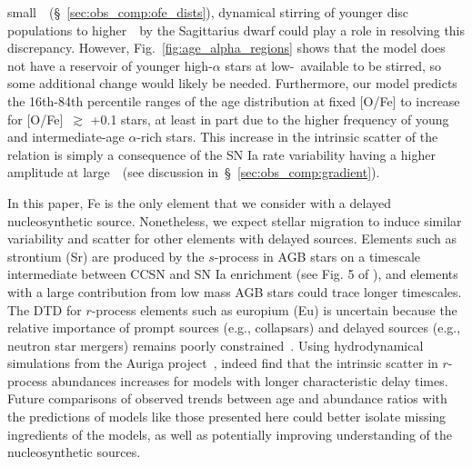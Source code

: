 \documentclass[draft2.tex]{subfiles}
\begin{document}
small~\rgal~(\S~\ref{sec:obs_comp:ofe_dists}), dynamical stirring of younger 
disc populations to higher~\absz~by the Sagittarius dwarf could play a role in 
resolving this discrepancy. 
However, Fig.~\ref{fig:age_alpha_regions} shows that the model does not have a 
reservoir of younger high-$\alpha$ stars at low-\absz~available to be stirred, 
so some additional change would likely be needed. 
Furthermore, our model predicts the 16th-84th percentile ranges of the age 
distribution at fixed [O/Fe] to increase for [O/Fe]~$\gtrsim$ +0.1 stars, at 
least in part due to the higher frequency of young and intermediate-age 
$\alpha$-rich stars. 
This increase in the intrinsic scatter of the relation is simply a consequence 
of the SN Ia rate variability having a higher amplitude at large~\rgal~(see 
discussion in~\S~\ref{sec:obs_comp:gradient}). 
\par 
In this paper, Fe is the only element that we consider with a delayed 
nucleosynthetic source. 
Nonetheless, we expect stellar migration to induce similar variability and 
scatter for other elements with delayed sources. 
Elements such as strontium (Sr) are produced by the $s$-process in AGB stars on 
a timescale intermediate between CCSN and SN Ia enrichment (see Fig. 5 of 
\citealp{Johnson2020}), and elements with a large contribution from low mass 
AGB stars could trace longer timescales. 
The DTD for $r$-process elements such as europium (Eu) is uncertain because the 
relative importance of prompt sources (e.g., collapsars) and delayed sources 
(e.g., neutron star mergers) remains poorly constrained~\citep{Cote2019, 
Mishenina2019, Siegel2019, Vincenzo2021b}. 
Using hydrodynamical simulations from the Auriga project~\citep{Grand2017}, 
\citet{vandeVoort2020} indeed find that the intrinsic scatter in $r$-process 
abundances increases for models with longer characteristic delay times. 
Future comparisons of observed trends between age and abundance ratios with the 
predictions of models like those presented here could better isolate missing 
ingredients of the models, as well as potentially improving understanding of 
the nucleosynthetic sources. 
\end{document}
